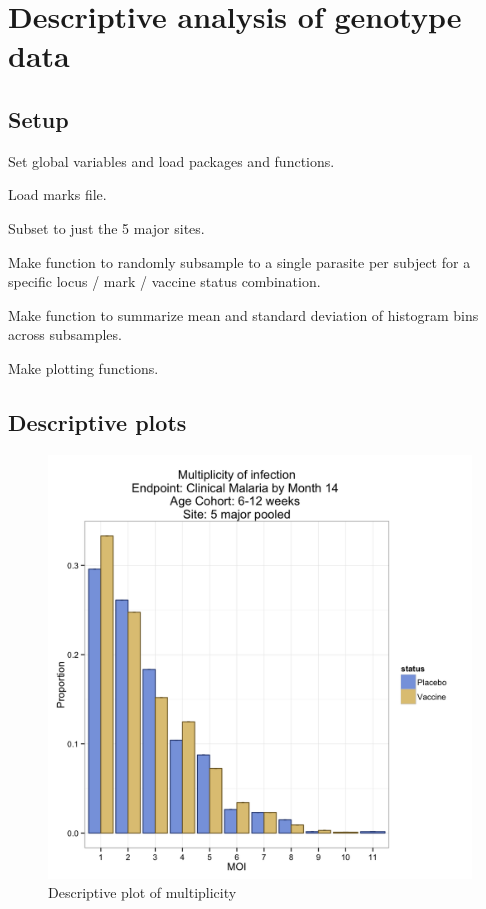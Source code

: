 \documentclass[]{article}
\author{}
\date{}
\begin{document}
\section{Descriptive analysis of genotype
data}\label{descriptive-analysis-of-genotype-data}

\subsection{Setup}\label{setup}

Set global variables and load packages and functions.

Load marks file.

Subset to just the 5 major sites.

Make function to randomly subsample to a single parasite per subject for
a specific locus / mark / vaccine status combination.

Make function to summarize mean and standard deviation of histogram bins
across subsamples.

Make plotting functions.

\subsection{Descriptive plots}\label{descriptive-plots}

\begin{figure}[htbp]
\centering
\includegraphics{figures/moi-newborn-c-1.png}
\caption{Descriptive plot of multiplicity}
\end{figure}
\end{document}
